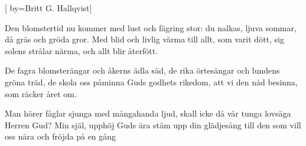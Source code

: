 [
by={Britt G. Hallqvist}]

\beginverse* 
Den blomstertid nu kommer med lust och fägring stor:
du nalkas, ljuva sommar, då gräs och gröda gror.
Med blid och livlig värma till allt, som varit dött,
sig solens strålar närma, och allt blir återfött.
\endverse

\beginverse* 
De fagra blomsterängar och åkerns ädla säd,
de rika örtesängar och lundens gröna träd,
de skola oss påminna Guds godhets rikedom,
att vi den nåd besinna, som räcker året om.
\endverse

\beginverse* 
Man hörer fåglar sjunga med mångahanda ljud,
skall icke då vår tunga lovsäga Herren Gud?
Min själ, upphöj Guds ära stäm upp din glädjesång
till den som vill oss nära och fröjda på en gång
\endverse

\endsong


